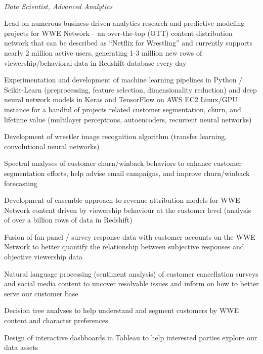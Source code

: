  \\  
\vspace{-0.8em}
\textit{Data Scientist, Advanced Analytics} 
\begin{itemize*}
  \item Lead on numerous business-driven analytics research and
    predictive modeling projects for WWE Network -- an
    over-the-top (OTT) content distribution network  that can be
    described as ``Netflix for Wrestling'' and currently supports nearly
    2 million active users, generating 1-3 million new rows of viewership/behavioral 
    data in Redshift database every day
  \item Experimentation and development of machine learning pipelines
    in Python / Scikit-Learn (preprocessing, feature selection, dimensionality reduction) and 
    deep neural network models in Keras and TensorFlow 
    on AWS EC2 Linux/GPU instance for a handful of projects related customer segmentation, churn, 
    and lifetime value (multilayer perceptrons, autoencoders, recurrent
    neural networks) 
  \item  Development of wrestler image recognition algorithm (transfer learning,
    convolutional neural networks)
  \item  Spectral analyses of customer churn/winback behaviors 
    to enhance customer segmentation efforts, help advise email campaigns, and
    improve churn/winback forecasting 
  \item Development of ensemble approach to revenue attribution models for WWE Network content
    driven by viewership behaviour at the customer level (analysis of
    over a billion rows of data in Redshift)
  \item  Fusion of fan panel / survey response data with customer accounts on the
    WWE Network to better quantify the relationship between
    subjective responses and objective viewership data
  \item Natural language processing (sentiment analysis) of customer cancellation surveys
    and social media content to uncover resolvable issues and inform on
    how to better serve our customer base
  \item  Decision tree analyses to help understand and segment
    customers by WWE content and character preferences
  \item Design of interactive dashboards in Tableau to help interested
    parties explore our data assets
\end{itemize*}
